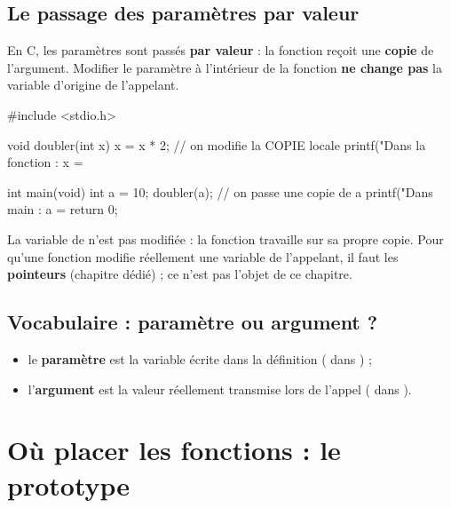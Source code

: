 \subsection{Le passage des paramètres par valeur}

\begin{propriete}
En C, les paramètres sont passés \textbf{par valeur} : la fonction reçoit une
\textbf{copie} de l'argument. Modifier le paramètre à l'intérieur de la fonction
\textbf{ne change pas} la variable d'origine de l'appelant.
\end{propriete}

\begin{codec}
#include <stdio.h>

void doubler(int x) {
    x = x * 2;                 // on modifie la COPIE locale
    printf("Dans la fonction : x = %
}

int main(void) {
    int a = 10;
    doubler(a);                // on passe une copie de a
    printf("Dans main : a = %
    return 0;
}
\end{codec}

\begin{attention}
La variable  de  n'est pas modifiée : la fonction travaille sur
sa propre copie. Pour qu'une fonction modifie réellement une variable de
l'appelant, il faut les \textbf{pointeurs} (chapitre dédié) ; ce n'est pas l'objet
de ce chapitre.
\end{attention}

\subsection{Vocabulaire : paramètre ou argument ?}

\begin{itemize}
  \item le \textbf{paramètre} est la variable écrite dans la définition
        ( dans ) ;
  \item l'\textbf{argument} est la valeur réellement transmise lors de l'appel
        ( dans ).
\end{itemize}

\section{Où placer les fonctions : le prototype}

